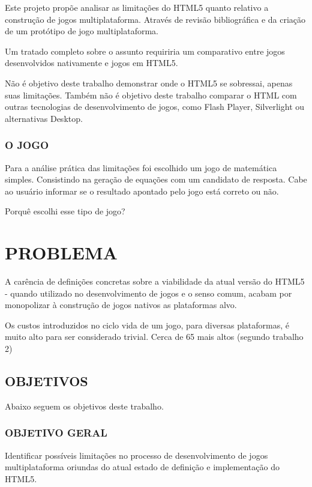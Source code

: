 \documentclass[11pt,a4paper]{article}
\begin{document}
Este projeto propõe analisar as limitações do HTML5 quanto relativo
a construção de jogos multiplataforma. Através de revisão
bibliográfica e da criação de um protótipo de jogo multiplataforma.

Um tratado completo sobre o assunto requiriria um comparativo entre
jogos desenvolvidos nativamente e jogos em HTML5.

Não é objetivo deste trabalho demonstrar onde o HTML5 se sobressai,
apenas suas limitações. Também não é objetivo deste trabalho
comparar o HTML com outras
tecnologias de desenvolvimento de jogos, como Flash Player, Silverlight
ou alternativas Desktop.

\subsubsection{O JOGO}

Para a análise prática das limitações foi escolhido um jogo de
matemática simples. Consistindo na geração de equações com um
candidato de resposta. Cabe ao usuário informar se o resultado apontado
pelo jogo está correto ou não.

Porquê escolhi esse tipo de jogo?

\section{PROBLEMA}
A carência de definições concretas sobre a viabilidade da atual
versão do HTML5 - quando utilizado no desenvolvimento de jogos e o
senso comum, acabam por monopolizar à construção de jogos nativos as
plataformas alvo.

Os custos introduzidos no ciclo vida de um jogo, para diversas
plataformas, é muito alto para ser considerado trivial. Cerca de 65%
mais altos (segundo trabalho 2)

\subsection{ OBJETIVOS}

Abaixo seguem os objetivos deste trabalho.

\subsubsection{  OBJETIVO GERAL}

Identificar possíveis limitações no processo de desenvolvimento
de jogos multiplataforma oriundas do atual estado de definição e
implementação do HTML5.
\end{document}
